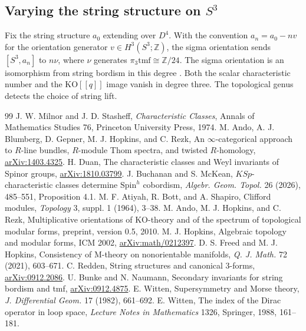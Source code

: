 \documentclass[11pt]{article}
\theoremstyle{definition}
\newcommand{\KO}{\mathrm{KO}}
\newcommand{\tmf}{\mathrm{tmf}}
\newcommand{\Z}{\mathbb Z}
\begin{document}
\subsection{Varying the string structure on \texorpdfstring{\(S^3\)}{the three-sphere}}\label{sec:s3-string-example}
Fix the string structure \(a_0\) extending over \(D^4\). With the convention \(a_n=a_0-nv\) for the orientation generator \(v\in H^3(S^3;\Z)\), the sigma orientation sends \([S^3,a_n]\) to \(n\nu\), where \(\nu\) generates \(\pi_3\tmf\cong\Z/24\). The sigma orientation is an isomorphism from string bordism in this degree \cite[\S\S2.2,6]{BN}. Both the scalar characteristic number and the \(\KO[[q]]\) image vanish in degree three. The topological genus detects the choice of string lift.

\begin{thebibliography}{99}\small
\setlength{\itemsep}{.8pt}\setlength{\parsep}{0pt}
 J. W. Milnor and J. D. Stasheff, \emph{Characteristic Classes}, Annals of Mathematics Studies 76, Princeton University Press, 1974.
 M. Ando, A. J. Blumberg, D. Gepner, M. J. Hopkins, and C. Rezk, An \(\infty\)-categorical approach to \(R\)-line bundles, \(R\)-module Thom spectra, and twisted \(R\)-homology, \href{https://arxiv.org/abs/1403.4325}{arXiv:1403.4325}.
 H. Duan, The characteristic classes and Weyl invariants of Spinor groups, \href{https://arxiv.org/abs/1810.03799}{arXiv:1810.03799}.
 J. Buchanan and S. McKean, \(KSp\)-characteristic classes determine \(\mathrm{Spin}^h\) cobordism, \emph{Algebr. Geom. Topol.} 26 (2026), 485--551, Proposition 4.1.
 M. F. Atiyah, R. Bott, and A. Shapiro, Clifford modules, \emph{Topology} 3, suppl. 1 (1964), 3--38.
 M. Ando, M. J. Hopkins, and C. Rezk, Multiplicative orientations of KO-theory and of the spectrum of topological modular forms, preprint, version 0.5, 2010.
 M. J. Hopkins, Algebraic topology and modular forms, ICM 2002, \href{https://arxiv.org/abs/math/0212397}{arXiv:math/0212397}.
 D. S. Freed and M. J. Hopkins, Consistency of M-theory on nonorientable manifolds, \emph{Q. J. Math.} 72 (2021), 603--671.
 C. Redden, String structures and canonical 3-forms, \href{https://arxiv.org/abs/0912.2086}{arXiv:0912.2086}.
 U. Bunke and N. Naumann, Secondary invariants for string bordism and tmf, \href{https://arxiv.org/abs/0912.4875}{arXiv:0912.4875}.
 E. Witten, Supersymmetry and Morse theory, \emph{J. Differential Geom.} 17 (1982), 661--692.
 E. Witten, The index of the Dirac operator in loop space, \emph{Lecture Notes in Mathematics} 1326, Springer, 1988, 161--181.

\end{thebibliography}
\end{document}
